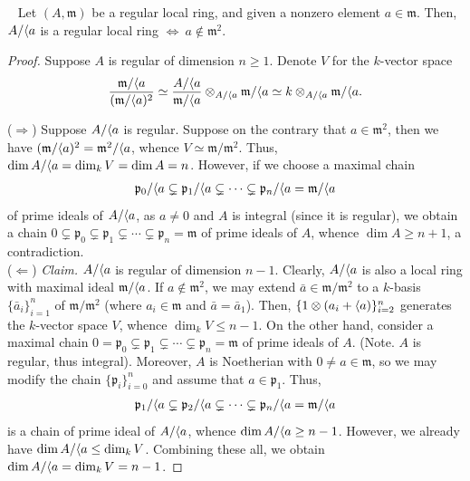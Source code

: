 \documentclass[11pt,a4paper,footinclude=true,headinclude=true]{scrbook} %
\newcommand{\pp}{\mathfrak{p}}
\newcommand{\mm}{\mathfrak{m}}
\newcommand{\<}{\langle}
\let\>\relax
\newcommand{\>}{\rangle}
\newenvironment{lemma}[2][]
{\renewcommand\theinnercustomlemma{#2}\innercustomlemma[#1]
\begin{mdframed}[backgroundcolor=gray!20]\ }
{\end{mdframed}\endinnercustomprop}
\begin{document}
\begin{lemma}{8.D}
    Let $(A,\mm)$ be a regular local ring, and given a nonzero element $a\in\mm$. Then, $A/\<a\>$ is a regular local ring $\Longleftrightarrow\ a\notin\mm^2$.
\end{lemma}
\begin{proof}
    Suppose $A$ is regular of dimension $n\geq1$. Denote $V$ for the $k$-vector space
    \begin{align*}
        \frac{\mm/\<a\>}{(\mm/\<a\>)^2}\simeq\frac{A/\<a\>}{\mm/\<a\>}\otimes_{A/\<a\>}\mm/\<a\>\simeq k\otimes_{A/\<a\>}\mm/\<a\>.
    \end{align*}
    
    ($\Rightarrow$) Suppose $A/\<a\>$ is regular. Suppose on the contrary that $a\in\mm^2$, then we have $(\mm/\<a\>)^2=\mm^2/\<a\>$, whence $V\simeq\mm/\mm^2$. Thus, $\dim A/\<a\>=\dim_kV=\dim A=n$. However, if we choose a maximal chain
    \begin{align*}
        \pp_0/\<a\>\subsetneq\pp_1/\<a\>\subsetneq\cdots\subsetneq\pp_n/\<a\>=\mm/\<a\>
    \end{align*}
    of prime ideals of $A/\<a\>$, as $a\neq0$ and $A$ is integral (since it is regular), we obtain a chain $0\subsetneq\pp_0\subsetneq\pp_1\subsetneq\cdots\subsetneq\pp_n=\mm$ of prime ideals of $A$, whence $\dim A\geq n+1$, a contradiction.\\
    
    ($\Leftarrow$) \textit{Claim.} $A/\<a\>$ is regular of dimension $n-1$. Clearly, $A/\<a\>$ is also a local ring with maximal ideal $\mm/\<a\>$. If $a\notin\mm^2$, we may extend $\bar{a}\in\mm/\mm^2$ to a $k$-basis $\{\bar{a}_i\}_{i=1}^n$ of $\mm/\mm^2$ (where $a_i\in\mm$ and $\bar{a}=\bar{a}_1$). Then, $\{1\otimes(a_i+\<a\>)\}_{i=2}^n$ generates the $k$-vector space $V$, whence $\dim_kV\leq n-1$. On the other hand, consider a maximal chain $0=\pp_0\subsetneq\pp_1\subsetneq\cdots\subsetneq\pp_n=\mm$ of prime ideals of $A$. (Note. $A$ is regular, thus integral). Moreover, $A$ is Noetherian with $0\neq a\in\mm$, so we may modify the chain $\{\pp_i\}_{i=0}^n$ and assume that $a\in\pp_1$. Thus, 
    \begin{align*}
        \pp_1/\<a\>\subsetneq\pp_2/\<a\>\subsetneq\cdots\subsetneq\pp_n/\<a\>=\mm/\<a\>
    \end{align*}
    is a chain of prime ideal of $A/\<a\>$, whence $\dim A/\<a\>\geq n-1$. However, we already have $\dim A/\<a\>\leq\dim_kV$. Combining these all, we obtain $\dim A/\<a\>=\dim_kV=n-1$.
\end{proof}
\end{document}
